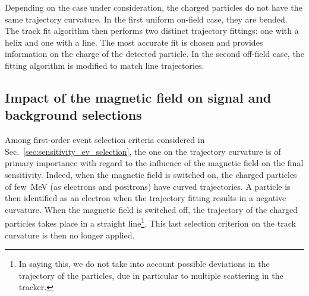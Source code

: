 Depending on the case under consideration, the charged particles do not have the same trajectory curvature.
In the first uniform on-field case, they are bended.
The track fit algorithm then performs two distinct trajectory fittings: one with a helix and one with a line.
The most accurate fit is chosen and provides information on the charge of the detected particle.
In the second off-field case, the fitting algorithm is modified to match line trajectories.

\subsection{Impact of the magnetic field on signal and background selections}
\label{subsec:impact_field}

Among first-order event selection criteria considered in Sec.~\ref{sec:sensitivity_ev_selection}, the one on the trajectory curvature is of primary importance with regard to the influence of the magnetic field on the final sensitivity.
Indeed, when the magnetic field is switched on, the charged particles of few~MeV (as electrons and positrons) have curved trajectories.
A particle is then identified as an electron when the trajectory fitting results in a negative curvature.
When the magnetic field is switched off, the trajectory of the charged particles takes place in a straight line\footnote{In saying this, we do not take into account possible deviations in the trajectory of the particles, due in particular to multiple scattering in the tracker.}.
This last selection criterion on the track curvature is then no longer applied.

